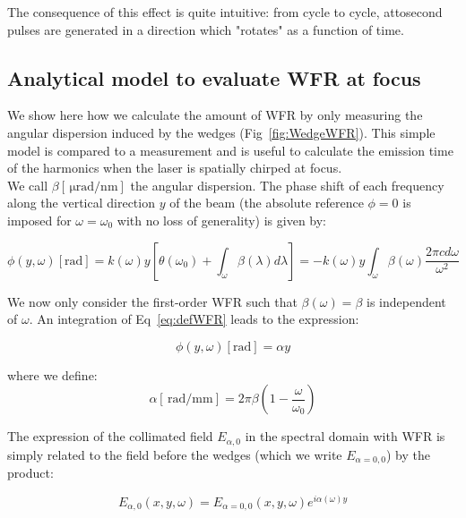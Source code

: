 \noindent The consequence of this effect is quite intuitive: from cycle to cycle, attosecond pulses are generated in a direction which "rotates" as a function of time.


\subsection{Analytical model to evaluate WFR at focus}
\label{subsub:Analytical model to evaluate WFR at focus}

We show here how we calculate the amount of WFR by only measuring the angular dispersion induced by the wedges (Fig~\ref{fig:WedgeWFR}). This simple model is compared to a measurement and is useful to calculate the emission time of the harmonics when the laser is spatially chirped at focus.\\

\noindent We call $\beta[\,\mathrm{\mu rad / nm}]$ the angular dispersion. The phase shift of each frequency along the vertical direction $y$ of the beam (the absolute reference $\phi =0$ is imposed for $\omega = \omega_0$ with no loss of generality) is given by:

\begin{equation}
\label{eq:defWFR}
\phi(y,\omega)[\mathrm{rad}] = k(\omega) y[\theta(\omega_0) + \int_{\omega}\beta(\lambda)d\lambda]=-k(\omega) y\int_{\omega}\beta(\omega)\frac{2\pi cd\omega}{\omega^2}
\end{equation}

\noindent We now only consider the first-order WFR  such that $\beta(\omega) = \beta$ is independent of $\omega$. An integration of Eq~\ref{eq:defWFR} leads to the expression:

\begin{equation}
\label{eq:defWFR2}
\phi(y,\omega)[\mathrm{rad}] = \alpha y
\end{equation}

\noindent where we define:
$$
\alpha[\,\mathrm{rad/mm}] = 2\pi\beta(1-\frac{\omega}{\omega_0})
$$



\noindent The expression of the collimated field $E_{\alpha,0}$ in the spectral domain with  WFR is simply related to the field before the wedges (which we write $E_{\alpha=0,0}$) by the product:

\begin{equation}
\label{eq:defWFR3}
E_{\alpha,0}(x,y,\omega) = E_{\alpha=0,0}(x,y,\omega)e^{i\alpha(\omega)y}
\end{equation}


